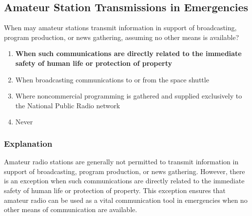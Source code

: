 \subsection{Amateur Station Transmissions in Emergencies}
\label{T1D09}

\begin{tcolorbox}[colback=gray!10!white,colframe=black!75!black,title=T1D09]
When may amateur stations transmit information in support of broadcasting, program production, or news gathering, assuming no other means is available?
\begin{enumerate}[label=\Alph*),noitemsep]
    \item \textbf{When such communications are directly related to the immediate safety of human life or protection of property}
    \item When broadcasting communications to or from the space shuttle
    \item Where noncommercial programming is gathered and supplied exclusively to the National Public Radio network
    \item Never
\end{enumerate}
\end{tcolorbox}

\subsubsection*{Explanation}
Amateur radio stations are generally not permitted to transmit information in support of broadcasting, program production, or news gathering. However, there is an exception when such communications are directly related to the immediate safety of human life or protection of property. This exception ensures that amateur radio can be used as a vital communication tool in emergencies when no other means of communication are available.